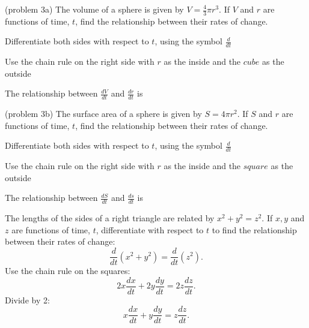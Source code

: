 \documentclass[handout]{ximera}
\begin{document}
\begin{problem}(problem 3a)
The volume of a sphere is given by $V = \tfrac{4}{3}\pi r^3$. If $V$ and $r$ are functions of time, $t$,
find the relationship between their rates of change.\\
\begin{hint}
Differentiate both sides with respect to $t$, using the symbol $\frac{d}{dt}$
\end{hint}
\begin{hint}
Use the chain rule on the right side with $r$ as the inside and the $cube$ as the outside
\end{hint}

The relationship between $\frac{dV}{dt}$ and $\frac{dr}{dt}$ is
\begin{multipleChoice}
\end{multipleChoice}
\end{problem}


\begin{problem}(problem 3b)
The surface area of a sphere is given by $S = 4\pi r^2$. If $S$ and $r$ are functions of time, $t$, 
find the relationship between their rates of change.\\
\begin{hint}
Differentiate both sides with respect to $t$, using the symbol $\frac{d}{dt}$
\end{hint}
\begin{hint}
Use the chain rule on the right side with $r$ as the inside and the $square$ as the outside
\end{hint}

The relationship between $\frac{dS}{dt}$ and $\frac{ds}{dt}$ is
\begin{multipleChoice}
\end{multipleChoice}
\end{problem}



\begin{example}[example 4]
The lengths of the sides of a right triangle are related by $x^2 + y^2 = z^2$. 
If $x, y$ and $z$ are functions of time, $t$, 
differentiate with respect to $t$ to find the relationship between their rates of change:
\[\frac{d}{dt} (x^2 + y^2 ) = \frac{d}{dt}( z^2).\]
Use the chain rule on the squares:
\[2x\frac{dx}{dt} + 2y\frac{dy}{dt} = 2z\frac{dz}{dt}.\]
Divide by 2:
\[x\frac{dx}{dt} + y\frac{dy}{dt} = z\frac{dz}{dt}.\]
\end{example}
\end{document}
